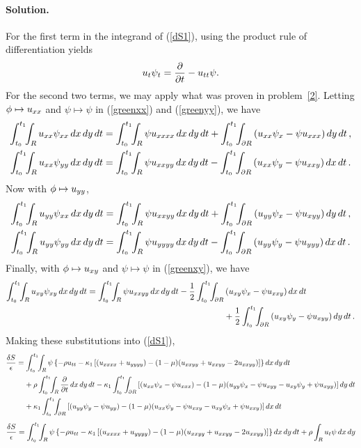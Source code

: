 \documentclass[11pt]{article}
\newcommand{\refeq}[1]{(\ref{#1})}
\newcommand{\beq}{\begin{equation*}}
\newcommand{\eeq}{\end{equation*}}
\newenvironment{solution}
{
    \paragraph{Solution.}
    \ignorespaces
}
{
}
\begin{document}
\begin{solution}
	For the first term in the integrand of \refeq{dS1}, using the product rule of differentiation yields
	\beq
		\ut \psit = \pdv{}{t} (\ut \psi) - \utt \psi.
	\eeq
	For the second two terms, we may apply what was proven in problem~\ref{2}.  Letting $\phi \mapsto u_{xx}$ and $\psi \mapsto \psi$ in \refeq{greenxx} and \refeq{greenyy}, we have
	\begin{align*}
		\inttr \uxx \psixx \drt &= \inttr \psi \uxxxx \drt + \inttdr \left( \uxx \psix - \psi \uxxx \right) \dd{y} \dd{t}, \\
		\inttr \uxx \psiyy \drt &= \inttr \psi \uxxyy \drt - \inttdr \left( \uxx \psiy - \psi \uxxy \right) \dd{x} \dd{t}.
	\end{align*}
	Now with $\phi \mapsto u_{yy}$,
	\begin{align*}
		\inttr \uyy \psixx \drt &= \inttr \psi \uxxyy \drt + \inttdr \left( \uyy \psix - \psi \uxyy \right) \dd{y} \dd{t}, \\
		\inttr \uyy \psiyy \drt &= \inttr \psi \uyyyy \drt - \inttdr \left( \uyy \psiy - \psi \uyyy \right) \dd{x} \dd{t}.
	\end{align*}
	Finally, with $\phi \mapsto u_{xy}$ and $\psi \mapsto \psi$ in \refeq{greenxy}, we have
	\begin{align*}
		\inttr \uxy \psixy \drt = \inttr \psi \uxxyy \drt - \frac{1}{2} \inttdr &\left( \uxy \psix - \psi \uxxy \right) \dd{x} \dd{t} \\
		&+ \frac{1}{2} \inttdr \left( \uxy \psiy - \psi \uxyy \right) \dd{y} \dd{t}.
	\end{align*}
	Making these substitutions into \refeq{dS1},
	\begin{align}
		\frac{\dS}{\eps} &= \inttr \psi \left\{ -\rho \utt - \kaq \left[ (\uxxxx + \uyyyy) - (1 - \mu) (\uxxyy + \uxxyy - 2 \uxxyy) \right] \right\} \drt \notag \\
		&\phantom{=\ } + \rho \inttr \pdv{}{t} (\ut \psi) \drt - \kaq \inttdr \left[ (\uxx \psix - \psi \uxxx) - (1 - \mu) (\uyy \psix - \psi \uxyy - \uxy \psiy + \psi \uxyy) \right] \dd{y} \dd{t} \notag \\
		&\phantom{=\ } + \kaq \inttdr \left[ (\uyy \psiy - \psi \uyy) - (1 - \mu) (\uxx \psiy - \psi \uxxy - \uxy \psix + \psi \uxxy) \right] \dd{x} \dd{t} \label{signerr}
	\end{align}
	\begin{align*}
		\frac{\dS}{\eps} &= \inttr \psi \left\{ -\rho \utt - \kaq \left[ (\uxxxx + \uyyyy) - (1 - \mu) (\uxxyy + \uxxyy - 2 \uxxyy) \right] \right\} \drt + \rho \intr \ut \psi \dd{x} \dd{y} \\

\end{align*}
\end{solution}
\end{document}
